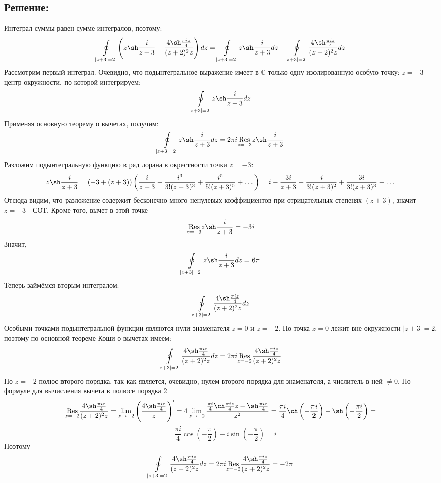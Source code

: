 \documentclass{article}
\begin{document}
	\subsection{Решение:}
	Интеграл суммы равен сумме интегралов, поэтому:
	\[\oint\limits_{|z+3|=2}\left(z \sh \frac{i}{z+3} - \frac{4 \sh \frac{\pi i z}{4}}{(z+2)^2z}\right) dz = \oint\limits_{|z+3|=2}z \sh \frac{i}{z+3}dz - \oint\limits_{|z+3|=2} \frac{4 \sh \frac{\pi i z}{4}}{(z+2)^2z} dz\]
	Рассмотрим первый интеграл. Очевидно, что подынтегральное выражение имеет в $\mathbb{C}$ только одну изолированную особую точку:  $z=-3$ -  центр окружности, по которой интегрируем:
	\[\oint\limits_{|z+3|=2}z \sh \frac{i}{z+3}dz\]
	Применяя основную теорему о вычетах, получим:
	\[\oint\limits_{|z+3|=2}z \sh \frac{i}{z+3}dz = 2\pi i \underset{z=-3}{\text{Res}}z\sh\frac{i}{z+3}\]
	Разложим подынтегральную функцию в ряд лорана в окрестности точки $z=-3$:
	\[z\sh\frac{i}{z+3} = (-3 + (z+3))\left(\frac{i}{z+3} + \frac{i^3}{3!(z+3)^3} + \frac{i^5}{5!(z+3)^5} +\dots\right) = i - \frac{3i}{z+3} - \frac{i}{3!(z+3)^2} + \frac{3i}{3!(z+3)^3} + \dots\]
	Отсюда видим, что разложение содержит бесконечно много ненулевых коэффициентов при отрицательных степенях $(z+3)$, значит $z=-3$ - СОТ. \newline 
	Кроме того, вычет в этой точке 
	\[\underset{z=-3}{\text{Res}}z\sh\frac{i}{z+3} = -3i\]
	Значит,
	\[\oint\limits_{|z+3|=2}z \sh \frac{i}{z+3}dz = 6\pi\]
	Теперь займёмся вторым интегралом:
	\[\oint\limits_{|z+3|=2} \frac{4 \sh \frac{\pi i z}{4}}{(z+2)^2z} dz\]
	Особыми точками подынтегральной функции являются нули знаменателя $z=0$ и $z=-2$. Но точка $z=0$ лежит вне окружности $|z+3|=2$, поэтому по основной теореме Коши о вычетах имеем:
	\[\oint\limits_{|z+3|=2} \frac{4 \sh \frac{\pi i z}{4}}{(z+2)^2z} dz = 2\pi i \underset{z=-2}{\text{Res}}\frac{4 \sh \frac{\pi i z}{4}}{(z+2)^2z} \]
	Но $z=-2$ полюс второго порядка, так как является, очевидно, нулем второго порядка для знаменателя, а числитель в ней $\ne 0$. По
	формуле для вычисления вычета в полюсе порядка 2
	\[\underset{z=-2}{\text{Res}}\frac{4 \sh \frac{\pi i z}{4}}{(z+2)^2z} = \lim\limits_{z\rightarrow -2} \left(\frac{4 \sh \frac{\pi i z}{4}}{z}\right)' = 4\lim\limits_{z\rightarrow-2}\frac{\frac{\pi i}{4}\ch\frac{\pi i z}{4}z - \sh\frac{\pi i z}{4}}{z^2} = \frac{\pi i }{4}\ch\left(-\frac{\pi i}{2}\right) - \sh \left(-\frac{\pi i}{2}\right) =\]
	\[=\frac{\pi i }{4}\cos\left(-\frac{\pi}{2}\right) - i\sin \left(-\frac{\pi}{2}\right) = i\]
	Поэтому
	\[\oint\limits_{|z+3|=2} \frac{4 \sh \frac{\pi i z}{4}}{(z+2)^2z} dz = 2\pi i \underset{z=-2}{\text{Res}}\frac{4 \sh \frac{\pi i z}{4}}{(z+2)^2z} = -2\pi\]
\end{document}
